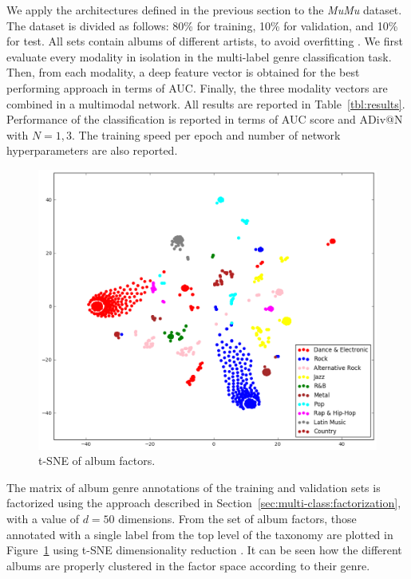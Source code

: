 We apply the architectures defined in the previous section to the \emph{MuMu} dataset. 
The dataset is divided as follows: 80\% for training, 10\% for validation, and 10\% for test. All sets contain albums of different artists, to avoid overfitting \citep{Flexer2007ACL}. We first evaluate every modality in isolation in the multi-label genre classification task. 
Then, from each modality, a deep feature vector is obtained for the best performing approach in terms of AUC. 
Finally, the three modality vectors are combined in a multimodal network. 
All results are reported in Table~\ref{tbl:results}. 
Performance of the classification is reported in terms of AUC score and ADiv@N with $N = 1, 3$. 
The training speed per epoch and number of network hyperparameters are also reported. 

\begin{figure}[!htp]
\centerline{
\includegraphics[width=0.9\columnwidth]{ch09_multi-class_pics/album_factors_train.png}}
\caption{t-SNE of album factors.}
\label{fig:tsne}
\end{figure}

The matrix of album genre annotations of the training and validation sets is factorized using the approach described in Section~\ref{sec:multi-class:factorization}, with a value of $d = 50$ dimensions.
From the set of album factors, those annotated with a single label from the top level of the taxonomy are plotted in Figure~\ref{fig:tsne} using t-SNE dimensionality reduction \citep{maaten2008visualizing}.
It can be seen how the different albums are properly clustered in the factor space according to their genre.



